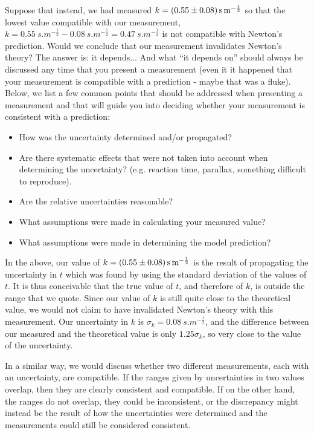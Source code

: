 Suppose that instead, we had measured $k=\SI{0.55 \pm 0.08}{s.m^{-\frac{1}{2}}}$ so that the lowest value compatible with our measurement, $k=\SI{0.55}{s.m^{-\frac{1}{2}}}-\SI{0.08}{s.m^{-\frac{1}{2}}}=\SI{0.47}{s.m^{-\frac{1}{2}}}$ is not compatible with Newton's prediction. Would we conclude that our measurement invalidates Newton's theory? The answer is: it depends... And what ``it depends on'' should always be discussed any time that you present a measurement (even it it happened that your measurement is compatible with a prediction - maybe that was a fluke). Below, we list a few common points that should be addressed when presenting a measurement and that will guide you into deciding whether your measurement is consistent with a prediction:
\begin{itemize}
\item How was the uncertainty determined and/or propagated?
\item Are there systematic effects that were not taken into account when determining the uncertainty? (e.g. reaction time, parallax, something difficult to reproduce).
\item Are the relative uncertainties reasonable?
\item What assumptions were made in calculating your measured value?
\item What assumptions were made in determining the model prediction? 
\end{itemize}
In the above, our value of $k= \SI{0.55 \pm 0.08}{s.m^{-\frac{1}{2}}}$ is the result of propagating the uncertainty in $t$ which was found by using the standard deviation of the values of $t$. It is thus conceivable that the true value of $t$, and therefore of $k$, is outside the range that we quote. Since our value of $k$ is still quite close to the theoretical value, we would not claim to have invalidated Newton's theory with this measurement. Our uncertainty in $k$ is $\sigma_k=\SI{0.08}{s.m^{-\frac{1}{2}}}$, and the difference between our measured and the theoretical value is only $1.25\sigma_k$, so very close to the value of the uncertainty. 

In a similar way, we would discuss whether two different measurements, each with an uncertainty, are compatible. If the ranges given by uncertainties in two values overlap, then they are clearly consistent and compatible. If on the other hand, the ranges do not overlap, they could be inconsistent, or the discrepancy might instead be the result of how the uncertainties were determined and the measurements could still be considered consistent. 


